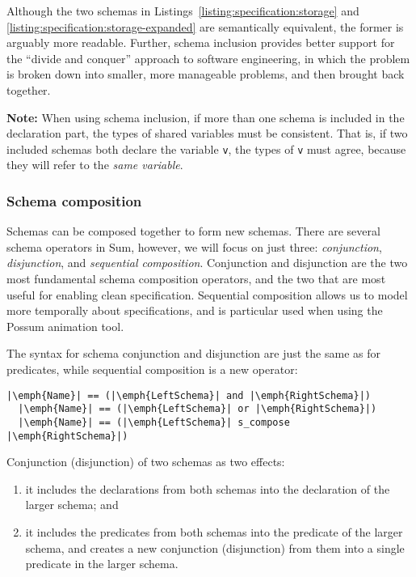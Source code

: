 Although the two schemas in Listings~\ref{listing:specification:storage} and \ref{listing:specification:storage-expanded} are semantically equivalent, the former is arguably more readable. Further, schema inclusion provides better support for the ``divide and conquer'' approach to software engineering, in which the problem is broken down into smaller, more manageable problems, and then brought back together.

\textbf{Note:} When using schema inclusion, if more than one schema is included in the declaration part, the types of shared variables must be consistent. That is, if two included schemas both declare the variable \texttt{v}, the types of \texttt{v} must agree, because they will refer to the \emph{same variable}.

\subsubsection*{Schema composition}

Schemas can be composed together to form new schemas. There are several schema operators in Sum, however, we will focus on just three: \emph{conjunction}, \emph{disjunction}, and \emph{sequential composition}. Conjunction and disjunction are the two most fundamental schema composition operators, and the two that are most useful for enabling clean specification. Sequential composition allows us to model more temporally about specifications, and is particular used when using the Possum animation tool.

The syntax for schema conjunction and disjunction are just the same as for predicates, while sequential composition is a new operator:

\lstset{aboveskip=3mm}
\begin{lstlisting}[escapeinside={||}]
  |\emph{Name}| == (|\emph{LeftSchema}| and |\emph{RightSchema}|)
  |\emph{Name}| == (|\emph{LeftSchema}| or |\emph{RightSchema}|)
  |\emph{Name}| == (|\emph{LeftSchema}| s_compose |\emph{RightSchema}|)
\end{lstlisting}

Conjunction (disjunction) of two schemas as two effects:

\begin{enumerate}
  \item it includes the declarations from both schemas into the declaration of the larger schema; and
  \item it includes the predicates from both schemas into the predicate of the larger schema, and creates a new conjunction (disjunction) from them into a single predicate in the larger schema.
\end{enumerate}

